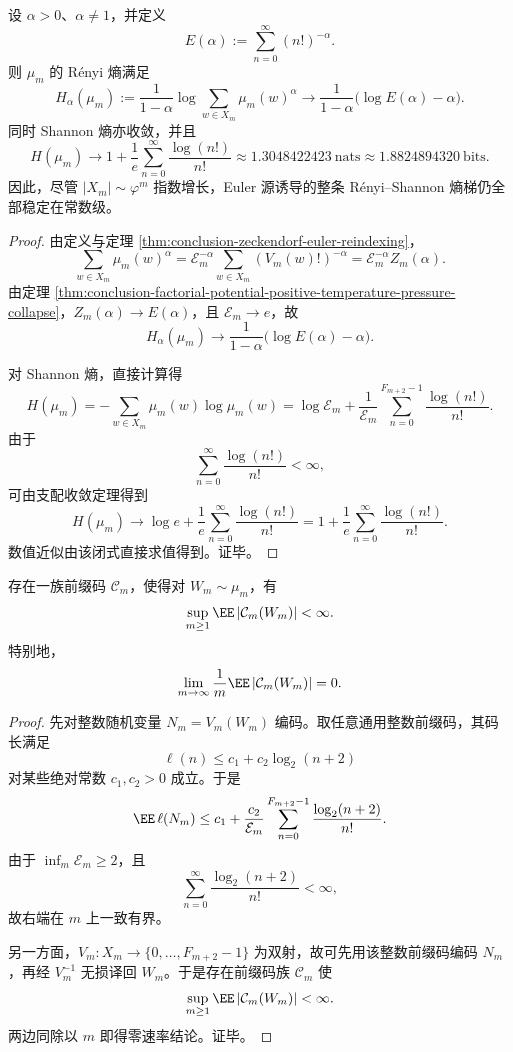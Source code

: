 \begin{theorem}\label{thm:conclusion-zeckendorf-euler-renyi-shannon-finite-limit}
设 \(\alpha>0\)、\(\alpha\neq 1\)，并定义
\[
E(\alpha):=\sum_{n=0}^{\infty}(n!)^{-\alpha}.
\]
则 \(\mu_m\) 的 Rényi 熵满足
\[
H_\alpha(\mu_m)
:=
\frac{1}{1-\alpha}\log\sum_{w\in X_m}\mu_m(w)^\alpha
\longrightarrow
\frac{1}{1-\alpha}\bigl(\log E(\alpha)-\alpha\bigr).
\]
同时 Shannon 熵亦收敛，并且
\[
H(\mu_m)\longrightarrow
1+\frac{1}{e}\sum_{n=0}^{\infty}\frac{\log(n!)}{n!}
\approx 1.3048422423\ \text{nats}
\approx 1.8824894320\ \text{bits}.
\]
因此，尽管 \(|X_m|\sim \varphi^m\) 指数增长，Euler 源诱导的整条 Rényi--Shannon 熵梯仍全部稳定在常数级。
\end{theorem}
\begin{proof}
由定义与定理 \ref{thm:conclusion-zeckendorf-euler-reindexing}，
\[
\sum_{w\in X_m}\mu_m(w)^\alpha
=
\mathcal E_m^{-\alpha}\sum_{w\in X_m}(V_m(w)!)^{-\alpha}
=
\mathcal E_m^{-\alpha}Z_m(\alpha).
\]
由定理 \ref{thm:conclusion-factorial-potential-positive-temperature-pressure-collapse}，\(Z_m(\alpha)\to E(\alpha)\)，且 \(\mathcal E_m\to e\)，故
\[
H_\alpha(\mu_m)\to \frac{1}{1-\alpha}\bigl(\log E(\alpha)-\alpha\bigr).
\]

对 Shannon 熵，直接计算得
\[
H(\mu_m)
=
-\sum_{w\in X_m}\mu_m(w)\log\mu_m(w)
=
\log\mathcal E_m+\frac{1}{\mathcal E_m}\sum_{n=0}^{F_{m+2}-1}\frac{\log(n!)}{n!}.
\]
由于
\[
\sum_{n=0}^{\infty}\frac{\log(n!)}{n!}<\infty,
\]
可由支配收敛定理得到
\[
H(\mu_m)\longrightarrow
\log e+\frac{1}{e}\sum_{n=0}^{\infty}\frac{\log(n!)}{n!}
=
1+\frac{1}{e}\sum_{n=0}^{\infty}\frac{\log(n!)}{n!}.
\]
数值近似由该闭式直接求值得到。证毕。
\end{proof}

\begin{proposition}\label{prop:conclusion-factorial-canonical-section-zero-rate-code}
存在一族前缀码 \(\mathcal C_m\)，使得对 \(W_m\sim \mu_m\)，有
\[
\sup_{m\ge 1}\EE\,|\mathcal C_m(W_m)|<\infty.
\]
特别地，
\[
\lim_{m\to\infty}\frac{1}{m}\EE\,|\mathcal C_m(W_m)|=0.
\]
\end{proposition}
\begin{proof}
先对整数随机变量 \(N_m=V_m(W_m)\) 编码。取任意通用整数前缀码，其码长满足
\[
\ell(n)\le c_1+c_2\log_2(n+2)
\]
对某些绝对常数 \(c_1,c_2>0\) 成立。于是
\[
\EE\,\ell(N_m)
\le
c_1+\frac{c_2}{\mathcal E_m}\sum_{n=0}^{F_{m+2}-1}\frac{\log_2(n+2)}{n!}.
\]
由于 \(\inf_m \mathcal E_m\ge 2\)，且
\[
\sum_{n=0}^{\infty}\frac{\log_2(n+2)}{n!}<\infty,
\]
故右端在 \(m\) 上一致有界。

另一方面，\(V_m:X_m\to\{0,\dots,F_{m+2}-1\}\) 为双射，故可先用该整数前缀码编码 \(N_m\)，再经 \(V_m^{-1}\) 无损译回 \(W_m\)。于是存在前缀码族 \(\mathcal C_m\) 使
\[
\sup_{m\ge 1}\EE\,|\mathcal C_m(W_m)|<\infty.
\]
两边同除以 \(m\) 即得零速率结论。证毕。
\end{proof}

